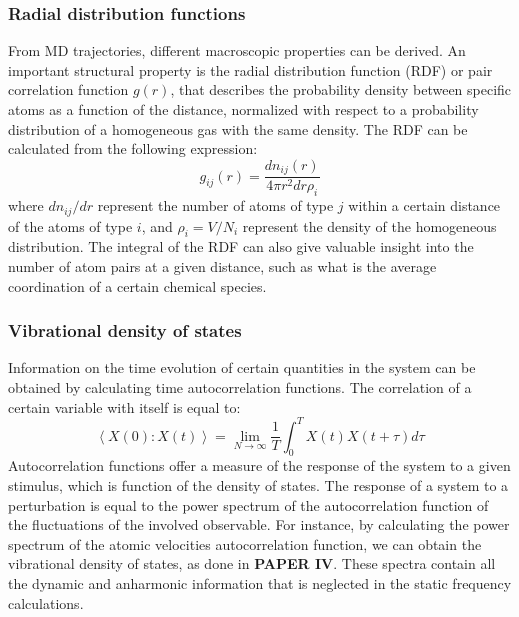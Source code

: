 \subsubsection*{Radial distribution functions}
From MD trajectories, different macroscopic properties can be derived. An important structural property is the radial distribution function (RDF) or pair correlation function $g(r)$, that describes the probability density between specific atoms as a function of the distance, normalized with respect to a probability distribution of a homogeneous gas with the same density. The RDF can be calculated from the following expression:
\[
g_{ij}(r) = \dfrac{dn_{ij}(r)}{4\pi r^2 dr \rho_i}
\]
where $dn_{ij}/dr$ represent the number of atoms of type $j$ within a certain distance of the atoms of type $i$, and $\rho_i = V / N_i $ represent the density of the homogeneous distribution. The integral of the RDF can also give valuable insight into the number of atom pairs at a given distance, such as what is the average coordination of a certain chemical species.

\subsubsection*{Vibrational density of states}
Information on the time evolution of certain quantities in the system can be obtained by calculating time autocorrelation functions. The correlation of a certain variable with itself is equal to:
\[
\left\langle X(0):X(t)\right\rangle = \lim_{N \to \infty} \dfrac{1}{T}\int_{0}^{T}X(t)X(t+\tau)d\tau
\]
Autocorrelation functions offer a measure of the response of the system to a given stimulus, which is function of the density of states. The response of a system to a perturbation is equal to the power spectrum of the autocorrelation function of the fluctuations of the involved observable\cite{kubo1957statistical}. For instance, by calculating the power spectrum of the atomic velocities autocorrelation function, we can obtain the vibrational density of states, as done in \textbf{PAPER IV}. These spectra contain all the dynamic and anharmonic information that is neglected in the static frequency calculations.

